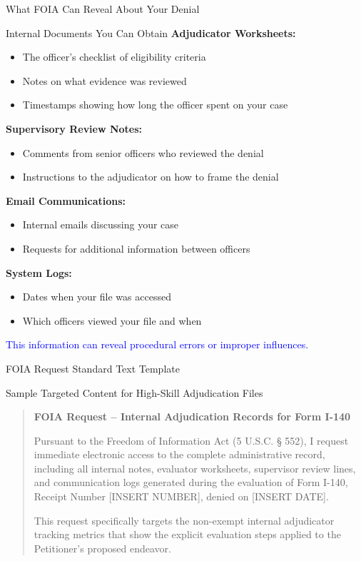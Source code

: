 \documentclass[11pt]{beamer}
\begin{document}
	\begin{frame}{What FOIA Can Reveal About Your Denial}
		\scriptsize
		\begin{block}{Internal Documents You Can Obtain}
			\textbf{Adjudicator Worksheets:}
			\begin{itemize}
				\item The officer's checklist of eligibility criteria
				\item Notes on what evidence was reviewed
				\item Timestamps showing how long the officer spent on your case
			\end{itemize}
			\textbf{Supervisory Review Notes:}
			\begin{itemize}
				\item Comments from senior officers who reviewed the denial
				\item Instructions to the adjudicator on how to frame the denial
			\end{itemize}
			\textbf{Email Communications:}
			\begin{itemize}
				\item Internal emails discussing your case
				\item Requests for additional information between officers
			\end{itemize}
			\textbf{System Logs:}
			\begin{itemize}
				\item Dates when your file was accessed
				\item Which officers viewed your file and when
			\end{itemize}
			\textcolor{blue}{This information can reveal procedural errors or improper influences.}
		\end{block}
	\end{frame}
	
	\begin{frame}{FOIA Request Standard Text Template}
		\scriptsize
		\begin{block}{Sample Targeted Content for High-Skill Adjudication Files}
			\begin{quote}
				\scriptsize
				\textbf{FOIA Request -- Internal Adjudication Records for Form I-140}
				
				Pursuant to the Freedom of Information Act (5 U.S.C. § 552), I request immediate electronic access to the complete administrative record, including all internal notes, evaluator worksheets, supervisor review lines, and communication logs generated during the evaluation of Form I-140, Receipt Number [INSERT NUMBER], denied on [INSERT DATE]. 
				
				This request specifically targets the non-exempt internal adjudicator tracking metrics that show the explicit evaluation steps applied to the Petitioner's proposed endeavor.
			\end{quote}
		\end{block}
	\end{frame}
	
\end{document}
